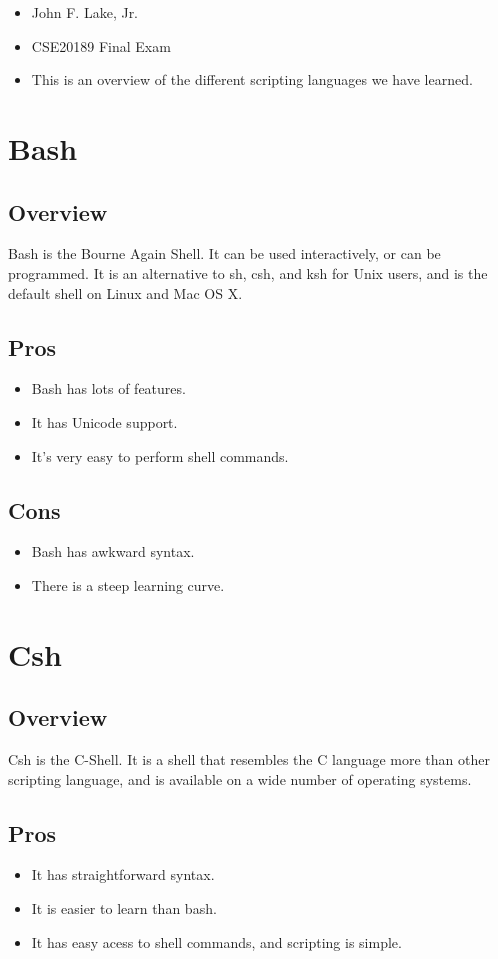 \documentclass{article}
\begin{document}
\begin{itemize}
\item John F. Lake, Jr. 
\item CSE20189 Final Exam
\item This is an overview of the different scripting languages we have learned.
\end{itemize} 
\section{Bash}
\subsection{Overview}
Bash is the Bourne Again Shell.  It can be used interactively, or can be programmed.  It is an alternative to sh, csh, and ksh for Unix users, and is the default shell on Linux and Mac OS X.
\subsection{Pros}
\begin{itemize}
\item Bash has lots of features.
\item It has Unicode support.
\item It's very easy to perform shell commands.
\end{itemize}
\subsection{Cons}
\begin{itemize}
\item Bash has awkward syntax.
\item There is a steep learning curve.
\end{itemize}
\section{Csh}
\subsection{Overview}
Csh is the C-Shell.  It is a shell that resembles the C language more than other scripting language, and is available on a wide number of operating systems. 
\subsection{Pros}
\begin{itemize}
\item It has straightforward syntax. 
\item It is easier to learn than bash. 
\item It has easy acess to shell commands, and scripting is simple. 
\end{itemize}
\end{document}
